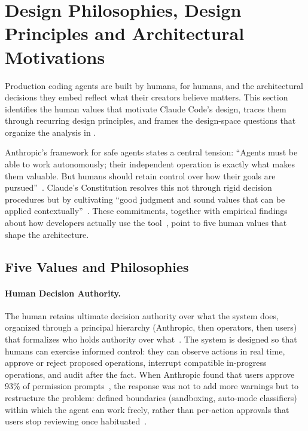 \section{Design Philosophies, Design Principles and Architectural Motivations}
\label{sec:values}

Production coding agents are built by humans, for humans, and the architectural decisions they embed reflect what their creators believe matters. This section identifies the human values that motivate Claude Code's design, traces them through recurring design principles, and frames the design-space questions that organize the analysis in .

Anthropic's framework for safe agents states a central tension: ``Agents must be able to work autonomously; their independent operation is exactly what makes them valuable. But humans should retain control over how their goals are pursued''~\citep{anthropic2025agents}. Claude's Constitution resolves this not through rigid decision procedures but by cultivating ``good judgment and sound values that can be applied contextually''~\citep{anthropic2026constitution}. These commitments, together with empirical findings about how developers actually use the tool~\citep{anthropic2025internal,anthropic2026autonomy}, point to five human values that shape the architecture.

\subsection{Five Values and Philosophies}
\label{sec:values:five}

\paragraph{Human Decision Authority.}
The human retains ultimate decision authority over what the system does, organized through a principal hierarchy (Anthropic, then operators, then users) that formalizes who holds authority over what~\citep{anthropic2026constitution}. The system is designed so that humans can exercise informed control: they can observe actions in real time, approve or reject proposed operations, interrupt compatible in-progress operations, and audit after the fact. When Anthropic found that users approve 93\% of permission prompts~\citep{anthropic2026automode}, the response was not to add more warnings but to restructure the problem: defined boundaries (sandboxing, auto-mode classifiers) within which the agent can work freely, rather than per-action approvals that users stop reviewing once habituated~\citep{anthropic2025sandboxing}.


